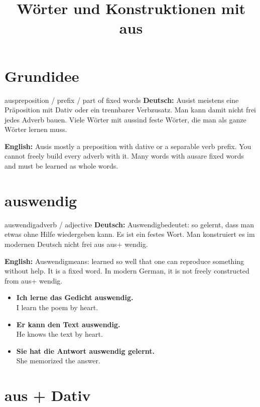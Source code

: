 \documentclass[a4paper,11pt]{article}
\title{Wörter und Konstruktionen mit \glqq aus\grqq}
\date{}
\newcommand{\GermanText}[1]{\textbf{Deutsch: }#1\par}
\newcommand{\EnglishText}[1]{{\small\color{SoftGray}\textbf{English: }#1\par}}
\newcommand{\ExampleItem}[2]{\item \textbf{#1}\\{\small\color{SoftGray}#2}}
\begin{document}
    \maketitle
    \tableofcontents
    \newpage

\section{Grundidee}

\begin{grammarentry}{aus}{preposition / prefix / part of fixed words}
\GermanText{\glqq Aus\grqq ist meistens eine Präposition mit Dativ oder ein trennbarer Verbzusatz. Man kann damit nicht frei jedes Adverb bauen. Viele Wörter mit \glqq aus\grqq sind feste Wörter, die man als ganze Wörter lernen muss.}
\EnglishText{\glqq Aus\grqq is mostly a preposition with dative or a separable verb prefix. You cannot freely build every adverb with it. Many words with \glqq aus\grqq are fixed words and must be learned as whole words.}
\end{grammarentry}

\section{auswendig}

\begin{grammarentry}{auswendig}{adverb / adjective}
\GermanText{\glqq Auswendig\grqq bedeutet: so gelernt, dass man etwas ohne Hilfe wiedergeben kann. Es ist ein festes Wort. Man konstruiert es im modernen Deutsch nicht frei aus \glqq aus\grqq + \glqq wendig\grqq.}
\EnglishText{\glqq Auswendig\grqq means: learned so well that one can reproduce something without help. It is a fixed word. In modern German, it is not freely constructed from \glqq aus\grqq + \glqq wendig\grqq.}

\begin{exbox}
\begin{itemize}
    \ExampleItem{Ich lerne das Gedicht auswendig.}{I learn the poem by heart.}
    \ExampleItem{Er kann den Text auswendig.}{He knows the text by heart.}
    \ExampleItem{Sie hat die Antwort auswendig gelernt.}{She memorized the answer.}
\end{itemize}
\end{exbox}
\end{grammarentry}

\section{aus + Dativ}
\end{document}
